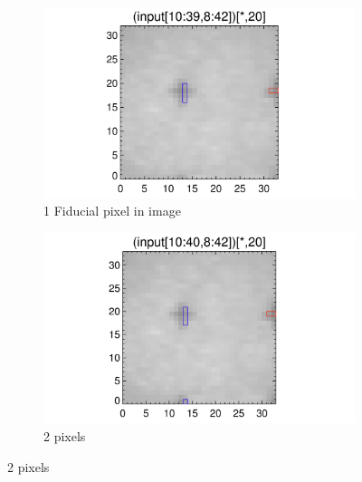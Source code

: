 \documentclass[10pt]{article}
\begin{document}
\begin{figure}[!h]
    \centering 
    \begin{subfigure}[b]{.45\linewidth}
        \centering
        \includegraphics[width=1.3\textwidth]{../plots_tables_images/moarfidcheck_withbothtruncate1.png}
        \caption{1 Fiducial pixel in image}
    \end{subfigure}
    \begin{subfigure}[b]{.45\linewidth}
        \centering
        \includegraphics[width=1.3\textwidth]{../plots_tables_images/moarfidcheck_withbothtruncate2.png}
        \caption{2 pixels}
    \end{subfigure}
   

\end{figure}
\end{document}
